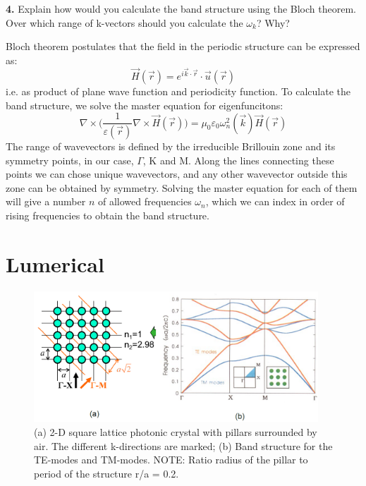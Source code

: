 \documentclass[11pt,a4paper]{article}
\begin{document}
\begin{displayquote}
\textbf{4.} Explain how would you calculate the band structure using the Bloch theorem. Over which range of k-vectors should you calculate the $\omega_k$? Why?
\end{displayquote}
Bloch theorem postulates that the field in the periodic structure can be expressed as:
\begin{equation*}
    \vec{H}(\vec{r}) = e^{i \vec{k}\cdot \vec{r}} \cdot \vec{u} (\vec{r})
\end{equation*}
i.e. as product of plane wave function and periodicity function. 
To calculate the band structure, we solve the master equation for eigenfuncitons:
\begin{equation*}
    \nabla \times \bigg(\frac{1}{\varepsilon(\vec{r})}\nabla \times\vec{H}({\vec{r}}) \bigg)=\mu_0 \varepsilon_0 \omega_n^2(\vec{k}) \vec{H} (\vec{r})
\end{equation*}
The range of wavevectors is defined by the irreducible Brillouin zone and its symmetry points, in our case, $\Gamma$, K and M. Along the lines connecting these points we can chose unique wavevectors, and any other wavevector outside this zone can be obtained by symmetry. Solving the master equation for each of them will give a number $n$ of allowed frequencies $\omega_n$, which we can index in order of rising frequencies to obtain the band structure. 
\section{Lumerical}


\begin{figure}[ht]
   \centering
    \includegraphics[width=0.95\textwidth]{fig1.png}
    \caption{(a) 2-D square lattice photonic crystal with pillars surrounded by air. The different k-directions are marked; (b) Band structure for the TE-modes and TM-modes. NOTE: Ratio radius of the pillar to period of the structure r/a = 0.2.}
    \label{fig:fig1}
\end{figure}
\end{document}
